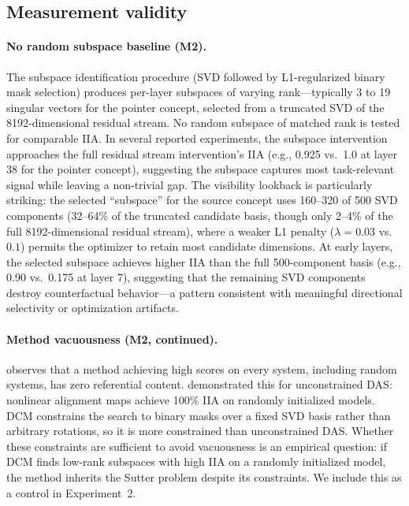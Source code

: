 \documentclass[11pt]{article}
\begin{document}
\subsection{Measurement validity}

\paragraph{No random subspace baseline (M2).}
The subspace identification procedure (SVD followed by L1-regularized binary mask selection) produces per-layer subspaces of varying rank---typically 3 to 19 singular vectors for the pointer concept, selected from a truncated SVD of the 8192-dimensional residual stream. No random subspace of matched rank is tested for comparable IIA. In several reported experiments, the subspace intervention approaches the full residual stream intervention's IIA (e.g., 0.925 vs.\ 1.0 at layer 38 for the pointer concept), suggesting the subspace captures most task-relevant signal while leaving a non-trivial gap. The visibility lookback is particularly striking: the selected ``subspace'' for the source concept uses 160--320 of 500 SVD components (32--64\% of the truncated candidate basis, though only 2--4\% of the full 8192-dimensional residual stream), where a weaker L1 penalty ($\lambda = 0.03$ vs.\ $0.1$) permits the optimizer to retain most candidate dimensions. At early layers, the selected subspace achieves higher IIA than the full 500-component basis (e.g., 0.90 vs.\ 0.175 at layer 7), suggesting that the remaining SVD components destroy counterfactual behavior---a pattern consistent with meaningful directional selectivity or optimization artifacts.

\paragraph{Method vacuousness (M2, continued).}
\citet{tower2026mechref} observes that a method achieving high scores on every system, including random systems, has zero referential content. \citet{sutter2025vacuous} demonstrated this for unconstrained DAS: nonlinear alignment maps achieve 100\% IIA on randomly initialized models. DCM constrains the search to binary masks over a fixed SVD basis rather than arbitrary rotations, so it is more constrained than unconstrained DAS. Whether these constraints are sufficient to avoid vacuousness is an empirical question: if DCM finds low-rank subspaces with high IIA on a randomly initialized model, the method inherits the Sutter problem despite its constraints. We include this as a control in Experiment~2.
\end{document}
